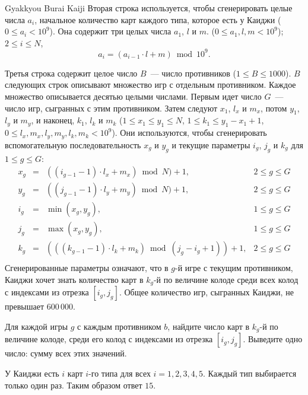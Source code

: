 \begin{problem}{Gyakkyou Burai Kaiji}
Вторая строка используется, чтобы сгенерировать целые числа $a_i$, начальное количество карт каждого типа, которое есть у Каиджи
($0 \le a_i < 10^9$). Она содержит три целых числа $a_1$, $l$ и $m$.
($0 \le a_1, l, m < 10^9$);  $2 \le i \le N$,
$$a_i = (a_{i-1} \cdot l + m) \bmod 10^9\text{.}$$


Третья строка содержит целое число $B$~--- число противников ($1 \le B \le 1000$).
$B$ следующих строк описывают множество игр с отдельным противником.
Каждое множество описывается десятью целыми числами.
Первым идет число $G$~--- число игр, сыгранных с этим противником.
Затем следуют $x_1$, $l_x$ и $m_x$, потом $y_1$, $l_y$ и $m_y$,
и наконец, $k_1$, $l_k$ и $m_k$
($1 \le x_1 \le y_1 \le N$, $1 \le k_1 \le y_1 - x_1 + 1$,
$0 \le l_x, m_x, l_y, m_y, l_k, m_k < 10^9$).
Они используются, чтобы сгенерировать вспомогательную последовательность $x_g$ и $y_g$ и
текущие параметры $i_g$, $j_g$ и $k_g$ для $1 \le g \le G$:
$$
\begin{array}{ccll}
x_g & = & ((i_{g - 1} - 1) \cdot l_x + m_x) \bmod N) + 1, & 2 \le g \le G \\
y_g & = & ((j_{g - 1} - 1) \cdot l_y + m_y) \bmod N) + 1, & 2 \le g \le G \\
i_g & = & \min(x_g, y_g), & 1 \le g \le G \\
j_g & = & \max(x_g, y_g), & 1 \le g \le G \\
k_g & = & (((k_{g - 1} - 1) \cdot l_k + m_k) \bmod (j_g - i_g + 1)) + 1,
& 2 \le g \le G \\
\end{array}
$$
Сгенерированные параметры означают, что в $g$-й игре с текущим противником,
Каиджи хочет знать количество карт в $k_g$-й по величине колоде среди всех колод с индексами из отрезка $[i_g, j_g]$.
Общее количество игр, сыгранных Каиджи, не превышает $600\,000$.
\OutputFile

Для каждой игры $g$ с каждым противником $b$, найдите число карт в $k_g$-й по величине колоде,
среди его колод с индексами из отрезка $[i_g, j_g]$.
Выведите одно число: сумму всех этих значений.

\Example

\begin{example}
%
\end{example}

\medskip

У Каиджи есть $i$ карт $i$-го типа для всех $i = 1, 2, 3, 4, 5$.
Каждый тип выбирается только один раз.
Таким образом ответ $15$.

\end{problem}
